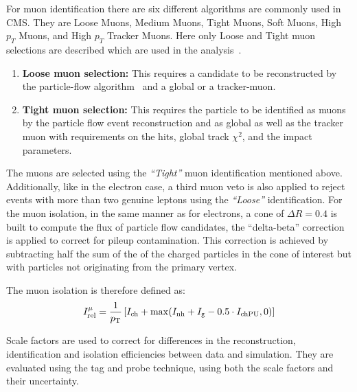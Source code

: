 For muon identification there are six different algorithms are commonly used in CMS. They are Loose Muons, Medium Muons, Tight Muons, Soft Muons, High $p_T$ Muons, and High $p_T$ Tracker Muons. Here only Loose and Tight muon selections are described which are used in the analysis~\cite{Kraetschmer2016}.
\begin{enumerate}
  \item \textbf{Loose muon selection:} This requires a candidate to be reconstructed by the particle-flow algorithm~\cite{Particle_flow_2010} and a global or a tracker-muon.
  \item \textbf{Tight muon selection:} This requires the particle to be identified as muons by the particle flow event reconstruction and as global as well as the tracker muon with requirements on the hits, global track $\chi^2$, and the impact parameters.
\end{enumerate}

The muons are selected using the {\em``Tight''} muon identification mentioned above.
Additionally, like in the electron case, a third muon veto is also applied to reject events with more than two genuine leptons using the {\em``Loose''} identification. 
For the muon isolation, in the same manner as for electrons, a cone of $\Delta R = 0.4$ is built to compute the flux of particle flow candidates, the ``delta-beta'' correction is applied to correct for pileup contamination.
This correction is achieved by subtracting half the sum of the \pt of the charged particles in the cone of interest but with particles not originating from the primary vertex.

The muon isolation is therefore defined as:
\begin{equation}
I^{\mu}_{\rm rel}=\frac{1}{p_{\rm T}}  \left[ I_{\rm ch}+\max(I_{\rm nh}+I_{\rm g}-0.5\cdot I_{\rm chPU} ,0) \right]
\label{eq:muisol}
\end{equation}
 
Scale factors are used to correct for differences in the reconstruction, identification and isolation efficiencies between data and simulation. They are evaluated using the tag and probe technique, using both the scale factors and their uncertainty.

